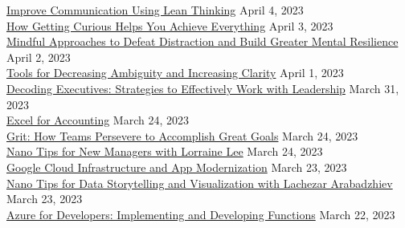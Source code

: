 \documentclass[10pt]{res} %
\begin{document}
\begin{resume}
\href{https://www.linkedin.com/learning/certificates/4aa09a571d3bc3cbcbf5d9907e79dfba24a6462470b9985a32f627788c319416}{\color{blue}Improve Communication Using Lean Thinking} \hfill April 4, 2023 \\
\href{https://www.linkedin.com/learning/certificates/e8cd90f050d98350b446010ddd50dbf1444912141f53318d1987322178ef5157}{\color{blue}How Getting Curious Helps You Achieve Everything} \hfill April 3, 2023 \\
\href{https://www.linkedin.com/learning/certificates/7b34e62dd128d62e37de8478291d35e3a1fa5421bbcef2e7578f90daca658557}{\color{blue}Mindful Approaches to Defeat Distraction and Build Greater Mental Resilience} \hfill April 2, 2023 \\
\href{https://www.linkedin.com/learning/certificates/55ad4f979a83c9af97910ac5bfbd2bc32ce0c739c60ef952e1447cd9b86739bd}{\color{blue}Tools for Decreasing Ambiguity and Increasing Clarity} \hfill April 1, 2023 \\
\href{https://www.linkedin.com/learning/certificates/8e81195af6a4e27418a36b072c32885c72ffd6f49205de2bdfc457601270bd06}{\color{blue}Decoding Executives: Strategies to Effectively Work with Leadership} \hfill March 31, 2023 \\
\href{https://www.linkedin.com/learning/certificates/77d8806d9b6f2591558d0cd987264cfd7cc96c81dd4b5f1ec5f60b6d43f13b1b}{\color{blue}Excel for Accounting} \hfill March 24, 2023 \\
\href{https://www.linkedin.com/learning/certificates/8536534fb7ca8b8339f2a7d80b0866bebbc96cdc1aacecde238a682ab9f1abd2}{\color{blue}Grit: How Teams Persevere to Accomplish Great Goals} \hfill March 24, 2023 \\
\href{https://www.linkedin.com/learning/certificates/d950f2849f82ed0b922d00e8efb203ed206533d596b1df303be66c598ab6e9c8}{\color{blue}Nano Tips for New Managers with Lorraine Lee} \hfill March 24, 2023 \\
\href{https://www.linkedin.com/learning/certificates/dcd8c4ed8e80dd50e80224c61669662a62f20293f7d77fcbc2e45ea50d46c539}{\color{blue}Google Cloud Infrastructure and App Modernization} \hfill March 23, 2023 \\
\href{https://www.linkedin.com/learning/certificates/5bc275612a2017987abbbc33d383f8afea27b56be434b9e8b0b0bfc1c48e3425}{\color{blue}Nano Tips for Data Storytelling and Visualization with Lachezar Arabadzhiev} \hfill March 23, 2023 \\
\href{https://www.linkedin.com/learning/certificates/25ac0a9c4c31ccf9a445199bc638e3869e69e052bb5b84b839c3aefeac3fc127}{\color{blue}Azure for Developers: Implementing and Developing Functions} \hfill March 22, 2023 \\

\end{resume}
\end{document}
